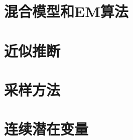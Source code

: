 \chapter{混合模型和EM算法}





\chapter{近似推断}








\chapter{采样方法}







\chapter{连续潜在变量}





%
%
%
%
%
%
%